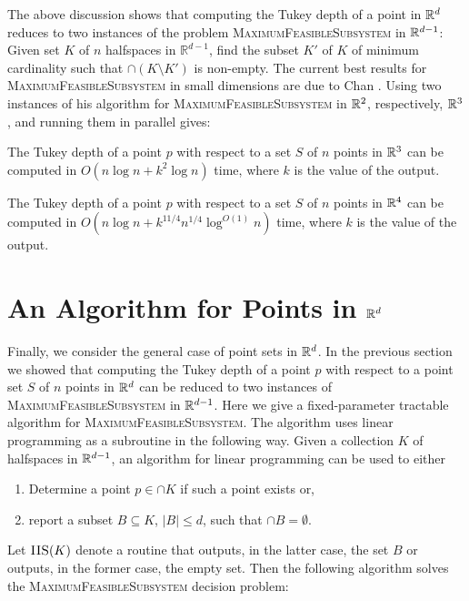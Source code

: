 \documentclass[charterfonts,lotsofwhite]{patmorin}
\begin{document}
The above discussion shows that computing the Tukey depth of a point
in $\mathbb{R}^d$ reduces to two instances of the problem
\textsc{MaximumFeasibleSubsystem} in $\mathbb{R}^{d-1}$: Given set $K$ of $n$
halfspaces in $\mathbb{R}^{d-1}$, find the subset $K'$ of $K$ of
minimum cardinality such that $\cap (K\setminus K')$ is non-empty.
The current best results for \textsc{MaximumFeasibleSubsystem} in
small dimensions are due to Chan \cite{c04}.  Using two instances of
his algorithm for \textsc{MaximumFeasibleSubsystem} in $\mathbb{R}^2$,
respectively, $\mathbb{R}^3$, and running them in parallel gives:

\begin{thm}
The Tukey depth of a point $p$ with respect to a set $S$ of $n$ points
in $\mathbb{R}^3$ can be computed in $O(n\log n + k^2\log n)$ time, where
$k$ is the value of the output.
\end{thm}


\begin{thm}
The Tukey depth of a point $p$ with respect to a set $S$ of $n$ points
in $\mathbb{R}^4$ can be computed in $O(n\log n + k^{11/4}n^{1/4}\log^{O(1)}
n)$ time, where $k$ is the value of the output.
\end{thm}

\section{An Algorithm for Points in $\mathbb{R}^d$}

Finally, we consider the general case of point sets in $\mathbb{R}^d$.  
In the previous section we showed that computing the Tukey depth of
a point $p$ with respect to a point set $S$ of $n$ points in $\mathbb{R}^d$
can be reduced to two instances of \textsc{MaximumFeasibleSubsystem}
in $\mathbb{R}^{d-1}$.  Here we give a fixed-parameter tractable \cite{dfXX}
algorithm for \textsc{MaximumFeasibleSubsystem}.  The algorithm uses
linear programming as a subroutine in the following way.  Given a
collection $K$ of halfspaces in $\mathbb{R}^{d-1}$, an algorithm for linear
programming can be used to either
\begin{enumerate}
\item Determine a point $p\in\cap K$ if such a point exists or,
\item report a subset $B\subseteq K$, $|B|\le d$, such that $\cap B=\emptyset$.
\end{enumerate}
Let $\textsc{IIS}(K)$ denote a routine that outputs, in the latter
case, the set
$B$ or outputs, in the former case, the empty set.
Then the following algorithm solves the
\textsc{MaximumFeasibleSubsystem} decision problem:
\end{document}
